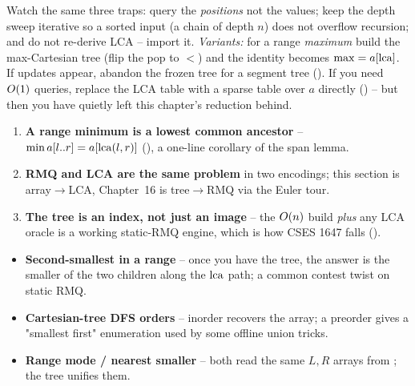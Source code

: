 
\begin{warningbox}
Watch the same three traps: query the \emph{positions} not the values; keep the depth sweep iterative so a
sorted input (a chain of depth $n$) does not overflow recursion; and do not re-derive LCA -- import it.
\emph{Variants:} for a range \emph{maximum} build the max-Cartesian tree (flip the pop to $<$) and the
identity becomes $\max = a[\operatorname{lca}]$. If updates appear, abandon the frozen tree for a segment tree
(). If you need $O(1)$ queries, replace the LCA table with a sparse table over $a$
directly () -- but then you have quietly left this chapter's reduction behind.
\end{warningbox}

\begin{insightbox}
\begin{enumerate}[nosep, leftmargin=1.6em]
  \item \textbf{A range minimum is a lowest common ancestor} -- $\min a[l..r]=a[\operatorname{lca}(l,r)]$
        (), a one-line corollary of the span lemma.
  \item \textbf{RMQ and LCA are the same problem} in two encodings; this section is
        array$\to$LCA, Chapter~16 is tree$\to$RMQ via the Euler tour.
  \item \textbf{The tree is an index, not just an image} -- the $O(n)$ build \emph{plus} any LCA oracle
        is a working static-RMQ engine, which is how CSES 1647 falls ().
\end{enumerate}
\end{insightbox}

\begin{hardeningbox}
\begin{itemize}[nosep, leftmargin=1.4em]
  \item \textbf{Second-smallest in a range} -- once you have the tree, the answer is the smaller of the
        two children along the $\operatorname{lca}$ path; a common contest twist on static RMQ.
  \item \textbf{Cartesian-tree DFS orders} -- inorder recovers the array; a preorder gives a "smallest
        first" enumeration used by some offline union tricks.
  \item \textbf{Range mode / nearest smaller} -- both read the same $L,R$ arrays from ;
        the tree unifies them.
\end{itemize}
\end{hardeningbox}


